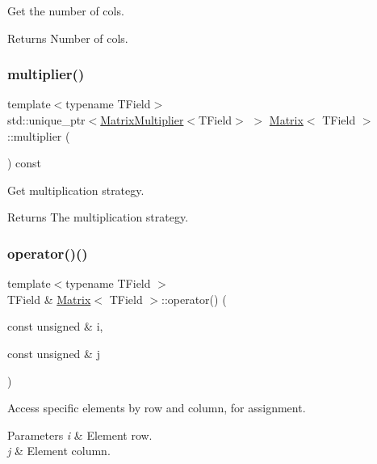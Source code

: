 Get the number of cols. 

\begin{DoxyReturn}{Returns}
Number of cols. 
\end{DoxyReturn}
\mbox{\label{classMatrix_a8b97189db83694ee636a3a5102eef151}} 
\subsubsection{\texorpdfstring{multiplier()}{multiplier()}}
{\footnotesize\ttfamily template$<$typename T\+Field$>$ \\
std\+::unique\+\_\+ptr$<$\mbox{\hyperlink{classMatrixMultiplier}{Matrix\+Multiplier}}$<$T\+Field$>$ $>$ \mbox{\hyperlink{classMatrix}{Matrix}}$<$ T\+Field $>$\+::multiplier (\begin{DoxyParamCaption}{ }\end{DoxyParamCaption}) const\hspace{0.3cm}{\ttfamily [inline]}}



Get multiplication strategy. 

\begin{DoxyReturn}{Returns}
The multiplication strategy. 
\end{DoxyReturn}
\mbox{\label{classMatrix_a9152e170e400598d3ced52e7b70e2d8b}} 
\subsubsection{\texorpdfstring{operator()()}{operator()()}\hspace{0.1cm}{\footnotesize\ttfamily [1/2]}}
{\footnotesize\ttfamily template$<$typename T\+Field $>$ \\
T\+Field \& \mbox{\hyperlink{classMatrix}{Matrix}}$<$ T\+Field $>$\+::operator() (\begin{DoxyParamCaption}\item[{const unsigned \&}]{i,  }\item[{const unsigned \&}]{j }\end{DoxyParamCaption})}



Access specific elements by row and column, for assignment. 


\begin{DoxyParams}{Parameters}
{\em i} & Element row. \\
\hline
{\em j} & Element column. \\
\hline
\end{DoxyParams}
\mbox{\label{classMatrix_a4d5a4a14c020275796dfa8c918badd7d}} 

